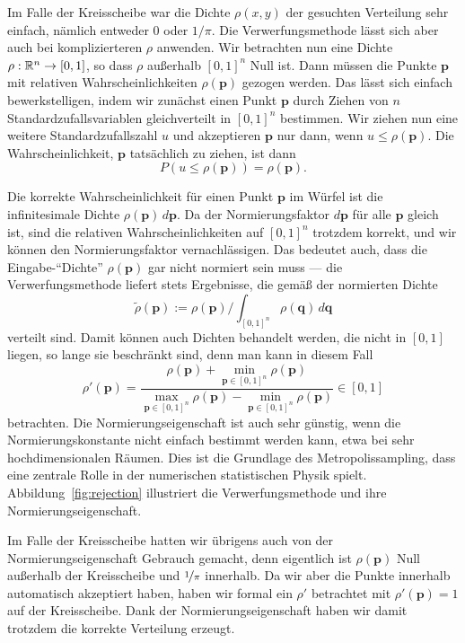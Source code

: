 Im Falle der Kreisscheibe war die Dichte $\rho(x, y)$ der gesuchten
Verteilung sehr einfach, nämlich entweder $0$ oder $1/\pi$. Die
Verwerfungsmethode lässt sich aber auch bei komplizierteren $\rho$
anwenden. Wir betrachten nun eine Dichte $\rho:\mathbb{R}^n\to [0,1]$, so
dass $\rho$ außerhalb $[0,1]^n$ Null ist. Dann müssen die Punkte
$\mathbf p$ mit relativen Wahrscheinlichkeiten $\rho(\mathbf p)$
gezogen werden. Das lässt sich einfach bewerkstelligen, indem wir
zunächst einen Punkt $\mathbf p$ durch Ziehen von $n$
Standardzufallsvariablen gleichverteilt in $[0,1]^n$ bestimmen. Wir
ziehen nun eine weitere Standardzufallszahl $u$ und akzeptieren
$\mathbf p$ nur dann, wenn $u\le\rho(\mathbf p)$. Die
Wahrscheinlichkeit, $\mathbf p$ tatsächlich zu ziehen, ist dann
\begin{equation}
  P(u \le\rho(\mathbf p)) = \rho(\mathbf p).
\end{equation}

Die korrekte Wahrscheinlichkeit für einen Punkt $\mathbf p$ im Würfel
ist die infinitesimale Dichte $\rho(\mathbf p)\,d\mathbf p$. Da der
Normierungsfaktor $d\mathbf p$ für alle $\mathbf p$ gleich ist, sind
die relativen Wahrscheinlichkeiten auf $[0,1]^n$ trotzdem korrekt, und
wir können den Normierungsfaktor vernachlässigen. Das bedeutet auch,
dass die Eingabe-"`Dichte"' $\rho(\mathbf p)$ gar nicht normiert sein
muss --- die Verwerfungsmethode liefert stets Ergebnisse, die gemäß
der normierten Dichte
\begin{equation}
  \tilde\rho(\mathbf p) := \rho(\mathbf p) / \int_{[0,1]^n} \rho(\mathbf q)\,d\mathbf q
\end{equation}
verteilt sind. Damit können auch Dichten behandelt werden, die nicht
in $[0,1]$ liegen, so lange sie beschränkt sind, denn man kann in
diesem Fall
\begin{equation}
  \rho'(\mathbf p) = \frac{\rho(\mathbf p) + \min_{\mathbf p\in [0,1]^n} \rho(\mathbf p)}{
    \max_{\mathbf p\in [0,1]^n} \rho(\mathbf p) - \min_{\mathbf p\in [0,1]^n} \rho(\mathbf p)} \in [0,1]
\end{equation}
betrachten. Die Normierungseigenschaft ist auch sehr günstig, wenn die
Normierungskonstante nicht einfach bestimmt werden kann, etwa bei sehr
hochdimensionalen Räumen. Dies ist die Grundlage des
Metropolissampling, dass eine zentrale Rolle in der numerischen
statistischen Physik spielt. Abbildung~\ref{fig:rejection} illustriert
die Verwerfungsmethode und ihre Normierungseigenschaft.

Im Falle der Kreisscheibe hatten wir übrigens auch von der
Normierungseigenschaft Gebrauch gemacht, denn eigentlich ist $\rho(\mathbf p)$
Null außerhalb der Kreisscheibe und $\nicefrac{1}{\pi}$ innerhalb. Da
wir aber die Punkte innerhalb automatisch akzeptiert haben, haben wir
formal ein $\rho'$ betrachtet mit $\rho'(\mathbf p) = 1$ auf der
Kreisscheibe. Dank der Normierungseigenschaft haben wir damit trotzdem
die korrekte Verteilung erzeugt.

